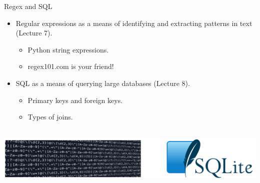 \documentclass[aspectratio=169]{../latex_main/tntbeamer}  %
\begin{document}
	 
	 \begin{frame}{Regex and SQL}
	     \begin{itemize}
	         \item Regular expressions as a means of identifying and extracting patterns in text (Lecture 7).
	         \begin{itemize}
	             \item Python string expressions.
	             \item regex101.com is your friend!
	         \end{itemize}
	         \item SQL as a means of querying large databases (Lecture 8).
	         \begin{itemize}
	             \item Primary keys and foreign keys.
	             \item Types of joins.
	         \end{itemize}
	     \end{itemize}
	     \\\bigskip
	     \includegraphics[scale=.4]{Bild3}
	 \end{frame}
	 
	 
	 
\end{document}
